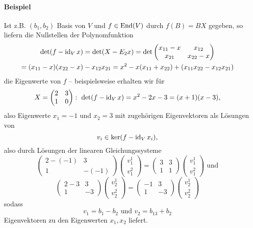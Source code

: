\paragraph{Beispiel}	
	Ist z.B. $ (b_1,b_2) $ Basis von $ V $ und $ f\in \operatorname{End}(V) $ durch $ f(B)=BX $ gegeben, so liefern die Nullstellen der Polynomfunktion
		\begin{gather*}
		\det(f-\operatorname{id}_Vx) = \det(X-E_2 x)= \det \begin{pmatrix}
		x_{11}-x & x_{12}\\
		x_{21} & x_{22} -x
		\end{pmatrix}\\
	= (x_{11}-x)(x_{22}-x)-x_{12}x_{21}
	= x^2 - x(x_{11}+x_{22}) + (x_{11}x_{22}-x_{12}x_{21})
		\end{gather*}
	die Eigenwerte von $ f $ -- beispielsweise erhalten wir für
		\[ X = \begin{pmatrix} 2 &3\\1 & 0 \end{pmatrix}:\ 
			\det(f-\id_Vx) = x^2-2x-3 = (x+1)(x-3), \]
	also Eigenwerte $ x_1 = -1 $ und $ x_2 = 3 $ mit zugehörigen Eigenvektoren als Lösungen von
		\[ v_i \in \ker(f-\operatorname{id}_Vx_i), \]
	also durch Lösungen der linearen Gleichungssysteme %
		\[ \begin{pmatrix}
		2-(-1) & 3\\ 1 & -(-1)
		\end{pmatrix}
		\begin{pmatrix}
		v_1^1\\v_1^2
		\end{pmatrix} = \begin{pmatrix}
		3 & 3\\ 1 & 1
		\end{pmatrix}
		\begin{pmatrix}
		v_1^1\\v_1^2
		\end{pmatrix} \text{ und} \]
		\[ \begin{pmatrix}
		2-3 & 3\\ 1 & -3
		\end{pmatrix}
		\begin{pmatrix}
		v_2^1\\v_2^2
		\end{pmatrix}=
		\begin{pmatrix}
		-1 & 3\\ 1 & -3
		\end{pmatrix}
		\begin{pmatrix}
		v_2^1\\v_2^2
		\end{pmatrix}  \]
	sodass
		\[ v_1 = b_1-b_2 \text{ und } v_2 = b_13+b_2 \]
	Eigenvektoren zu den Eigenwerten $ x_1,x_2 $ liefert.


